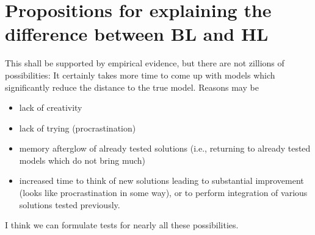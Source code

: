 \section{Propositions for explaining the difference between BL and HL}

This shall be supported by empirical evidence, but there are not zillions of possibilities: It certainly takes more time to come up with models which significantly reduce the distance to the true model. Reasons may be 

\begin{itemize}
\item lack of creativity
\item lack of trying (procrastination)
\item memory afterglow of already tested solutions (i.e., returning to already tested models which do not bring much)
\item increased time to think of new solutions leading to substantial improvement (looks like procrastination in some way), or to perform integration of various solutions tested previously.
\end{itemize}

I think we can formulate tests for nearly all these possibilities.

  